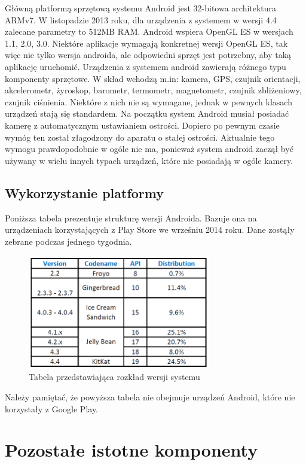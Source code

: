 Główną platformą sprzętową systemu Android jest 32-bitowa architektura ARMv7. W listopadzie 2013 roku, dla urządzenia z systemem w wersji 4.4 zalecane parametry to 512MB RAM. \cite{android:50} Android wspiera OpenGL ES w wersjach 1.1, 2.0, 3.0. Niektóre aplikacje wymagają konkretnej wersji OpenGL ES, tak więc nie tylko wersja androida, ale odpowiedni sprzęt jest potrzebny, aby taką aplikację uruchomić.\cite{android:51} Urządzenia z systemem android zawierają różnego typu komponenty sprzętowe. W skład wchodzą m.in: kamera, GPS, czujnik orientacji, akcelerometr, żyroskop, barometr, termometr, magnetometr, czujnik zbliżeniowy, czujnik ciśnienia. Niektóre z nich nie są wymagane, jednak w pewnych klasach urządzeń stają się standardem. Na początku system Android musiał posiadać kamerę z automatycznym ustawianiem ostrości. Dopiero po pewnym czasie wymóg ten został złagodzony do aparatu o stałej ostrości.\cite{android:52} Aktualnie tego wymogu prawdopodobnie w ogóle nie ma, ponieważ system android zaczął być używany w wielu innych typach urządzeń, które nie posiadają w ogóle kamery.


\subsection{Wykorzystanie platformy}

Poniższa tabela prezentuje strukturę wersji Androida. Bazuje ona na  urządzeniach korzystających z Play Store we wrześniu 2014 roku. Dane zostąły zebrane podczas jednego tygodnia.\cite{android:38}

\begin{figure}[H] 
\centering\includegraphics[width=8cm]{figures/android/distributionChart}
\caption{Tabela przedstawiająca rozkład wersji systemu}
\end{figure}


Należy pamiętać, że powyższa tabela nie obejmuje urządzeń Android, które nie korzystały z Google Play.


\section{Pozostałe istotne komponenty}


